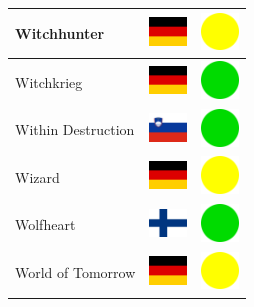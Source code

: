 \documentclass[12pt, a4paper, twoside]{report}
\begin{document}
\begin{center}
\begin{longtable}{|p{5cm}|p{2cm}|p{2cm}|}
 Witchhunter                                                & \includegraphics[width=1cm]{4x3/de} &   \includegraphics[width=1cm]{likes/m} \\ \hline
 Witchkrieg                                                 & \includegraphics[width=1cm]{4x3/de} &   \includegraphics[width=1cm]{likes/y} \\ \hline
 Within Destruction                                         & \includegraphics[width=1cm]{4x3/si} &   \includegraphics[width=1cm]{likes/y} \\ \hline
 Wizard                                                     & \includegraphics[width=1cm]{4x3/de} &   \includegraphics[width=1cm]{likes/m} \\ \hline
 Wolfheart                                                  & \includegraphics[width=1cm]{4x3/fi} &   \includegraphics[width=1cm]{likes/y} \\ \hline
 World of Tomorrow                                          & \includegraphics[width=1cm]{4x3/de} &   \includegraphics[width=1cm]{likes/m} \\ \hline

\end{longtable}
\end{center}
\end{document}
